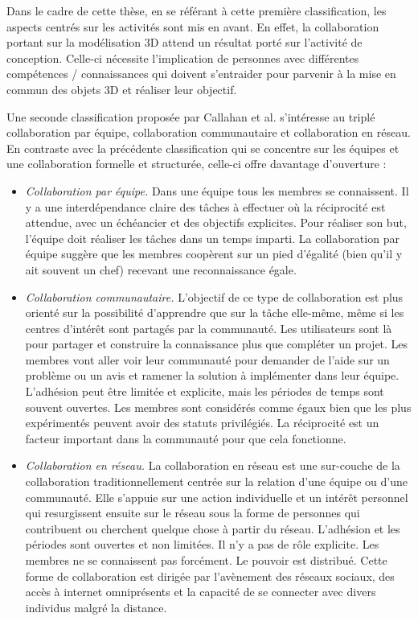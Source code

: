 Dans le cadre de cette thèse, en se référant à cette première classification, les 
aspects centrés sur les activités sont mis en avant. En effet, la collaboration 
portant sur la modélisation 3D attend un résultat porté sur l'activité de conception. 
Celle-ci nécessite l'implication de personnes avec différentes compétences / 
connaissances qui doivent s'entraider pour parvenir à la mise en commun des 
objets 3D et réaliser leur objectif. 

Une seconde classification proposée par Callahan et al. 
\cite{Callahan2008} s'intéresse au triplé \og{} collaboration par équipe\fg{}, \og{} collaboration 
communautaire\fg{} et \og{} collaboration en réseau\fg{}. En contraste avec la précédente 
classification qui se concentre sur les équipes et une collaboration formelle et 
structurée, celle-ci offre davantage d'ouverture :
\begin{itemize}
	\item \textit{Collaboration par équipe.}
	Dans une équipe tous les membres se connaissent. Il y a une interdépendance 
	claire des tâches à effectuer où la réciprocité est attendue, avec un échéancier 
	et des objectifs explicites. Pour réaliser son but, l'équipe doit réaliser les tâches 
	dans un temps imparti. La collaboration par équipe suggère que les membres 
	coopèrent sur un pied d'égalité (bien qu'il y ait souvent un chef) recevant une 
	reconnaissance égale.
	
	\item \textit{Collaboration communautaire.}
	L'objectif de ce type de collaboration est plus orienté sur la possibilité 
	d'apprendre que sur la tâche elle-même, même si les centres d'intérêt sont 
	partagés par la communauté. Les utilisateurs sont là pour partager et construire 
	la connaissance plus que compléter un projet. Les membres vont aller voir leur 
	communauté pour demander de l'aide sur un problème ou un avis et ramener la 
	solution à implémenter dans leur équipe. L'adhésion peut être limitée et 
	explicite, mais les périodes de temps sont souvent ouvertes. Les membres 
	sont considérés comme égaux bien que les plus expérimentés peuvent avoir 
	des statuts privilégiés. La réciprocité est un facteur important dans la 
	communauté pour que cela fonctionne.
	
	\item \textit{Collaboration en réseau.}
	La collaboration en réseau est une sur-couche de la collaboration 
	traditionnellement centrée sur la relation d'une équipe ou d'une communauté. 
	Elle s'appuie sur une action individuelle et un intérêt personnel qui resurgissent 
	ensuite sur le réseau sous la forme de personnes qui contribuent ou cherchent 
	quelque chose à partir du réseau. L'adhésion et les périodes sont ouvertes et 
	non limitées. Il n'y a pas de rôle explicite. Les membres ne se connaissent pas 
	forcément. Le pouvoir est distribué. Cette forme de collaboration est dirigée par 
	l'avènement des réseaux sociaux, des accès à internet omniprésents et la 
	capacité de se connecter avec divers individus malgré la distance.
\end{itemize}
